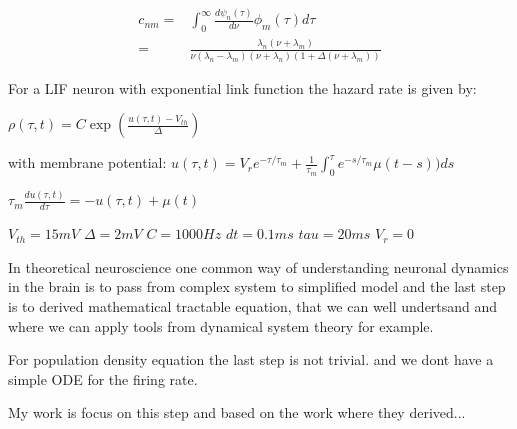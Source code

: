 \documentclass[a4paper,12pt,twoside]{article}
\begin{document}
\begin{align}
c_{nm}=&\int_0^\infty\frac{d\psi_n(\tau)}{d\nu}\phi_m(\tau)d\tau\\
=&\frac{\lambda_n(\nu+\lambda_m)}{\nu(\lambda_n-\lambda_m)(\nu+\lambda_n)(1+\Delta(\nu+\lambda_m))}
\end{align}






For a LIF neuron with exponential link function the hazard rate is given by:

$\rho(\tau,t)=C\exp(\frac{u(\tau,t)-V_{th}}{\Delta})$

with membrane potential:
$u(\tau,t)=V_r e^{-\tau/\tau_m}+\frac{1}{\tau_m}\int_0^\tau  e^{-s/\tau_m}\mu(t-s))ds$

$\tau_m\frac{du(\tau,t)}{d\tau}=-u(\tau,t)+\mu(t)$

$V_{th}=15  mV$
$\Delta = 2     mV$
$C=1000 Hz$
$dt=0.1    ms$
$tau=20   ms$
$V_r=0  $


In theoretical neuroscience one common way of understanding neuronal dynamics in the brain is to pass from complex system to simplified model and the last step is to derived mathematical tractable equation, that we can well undertsand and where we can apply  tools from dynamical system theory for example. 

For population density equation the last step is not trivial. and we dont have a simple ODE for the firing rate.

My work is focus on this step and based on the work where they derived...


\newpage

\mbox{}
\nocite{*}
%


\end{document}
